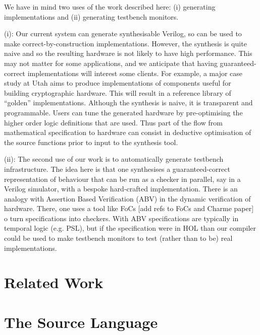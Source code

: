 \documentclass{llncs}
\begin{document}
We have in mind two uses of the work described here: (i) generating
implementations and (ii) generating testbench monitors.

(i): Our current system can generate synthesisable Verilog, so can be
used to make correct-by-construction implementations. However, the
synthesis is quite naive and so the resulting hardware is not likely
to have high performance. This may not matter for some applications,
and we anticipate that having guaranteed-correct implementations will
interest some clients. For example, a major case study at Utah aims to
produce implementations of components useful for building
cryptographic hardware.  This will result in a reference library of ``golden''
implementations. Although the synthesis is naive, it is transparent
and programmable. Users can tune the generated hardware by
pre-optimising the higher order logic definitions that are used. Thus
part of the flow from mathematical specification to hardware can
consist in deductive optimisation of the source functions prior to
input to the synthesis tool.

(ii): The second use of our work is to automatically generate testbench
infrastructure. The idea here is that one synthesises a
guaranteed-correct representation of behaviour that can be run as a checker in
parallel, say in a Verilog simulator, with a bespoke hard-crafted
implementation. There is an analogy with
Assertion Based Verification (ABV) in the dynamic verification of
hardware. There, one uses a tool like FoCs [add refs to FoCs and Charme paper] 
o turn specifications into checkers.  With ABV specifications
are typically in temporal logic (e.g.{} PSL), but if the specification
were in HOL than our compiler could be used to make
testbench monitors to test (rather than to be) real implementations.



\section{Related Work}
\label{secRelatedWork}


\section{The Source Language}
\label{secTheSourceLanguage}
\end{document}
